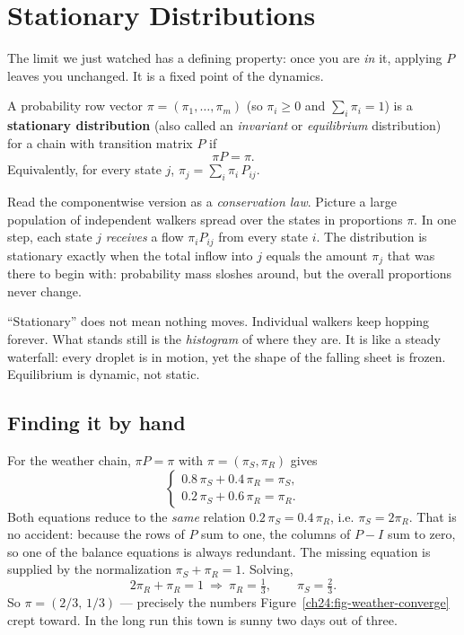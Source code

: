 \section{Stationary Distributions}
\label{ch24:stationary}

The limit we just watched has a defining property: once you are \emph{in} it,
applying $P$ leaves you unchanged. It is a fixed point of the dynamics.

\begin{definition}
\label{ch24:def-stationary}
A probability row vector $\pi = (\pi_1,\dots,\pi_m)$ (so $\pi_i \ge 0$ and
$\sum_i \pi_i = 1$) is a \textbf{stationary distribution} (also called an
\emph{invariant} or \emph{equilibrium} distribution) for a chain with transition
matrix $P$ if
\[
  \pi P = \pi.
\]
Equivalently, for every state $j$, \quad $\displaystyle \pi_j = \sum_i \pi_i\,P_{ij}$.
\end{definition}

Read the componentwise version as a \emph{conservation law}. Picture a large
population of independent walkers spread over the states in proportions $\pi$.
In one step, each state $j$ \emph{receives} a flow $\pi_i P_{ij}$ from every state
$i$. The distribution is stationary exactly when the total inflow into $j$ equals
the amount $\pi_j$ that was there to begin with: probability mass sloshes around,
but the overall proportions never change.

\begin{intuitionbox}
``Stationary'' does not mean nothing moves. Individual walkers keep hopping
forever. What stands still is the \emph{histogram} of where they are. It is like
a steady waterfall: every droplet is in motion, yet the shape of the falling
sheet is frozen. Equilibrium is dynamic, not static.
\end{intuitionbox}

\subsection{Finding it by hand}

For the weather chain, $\pi P = \pi$ with $\pi = (\pi_S, \pi_R)$ gives
\[
  \begin{cases}
    0.8\,\pi_S + 0.4\,\pi_R = \pi_S,\\
    0.2\,\pi_S + 0.6\,\pi_R = \pi_R.
  \end{cases}
\]
Both equations reduce to the \emph{same} relation $0.2\,\pi_S = 0.4\,\pi_R$, i.e.
$\pi_S = 2\pi_R$. That is no accident: because the rows of $P$ sum to one, the
columns of $P - I$ sum to zero, so one of the balance equations is always
redundant. The missing equation is supplied by the normalization
$\pi_S + \pi_R = 1$. Solving,
\[
  2\pi_R + \pi_R = 1 \ \Rightarrow\ \pi_R = \tfrac13,\qquad \pi_S = \tfrac23.
\]
So $\pi = (2/3,\,1/3)$ --- precisely the numbers Figure~\ref{ch24:fig-weather-converge}
crept toward. In the long run this town is sunny two days out of three.

